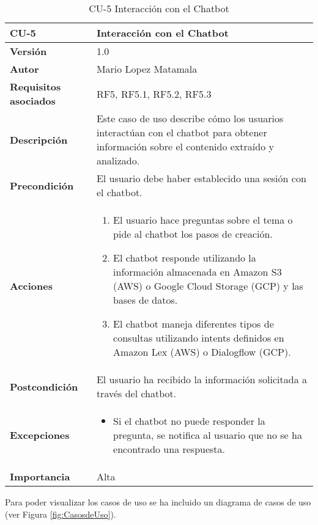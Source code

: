 \begin{table}[p]
\centering
\begin{tabularx}{\linewidth}{ p{} p{} }
\toprule
\textbf{CU-5} & \textbf{Interacción con el Chatbot} \\
\toprule
\textbf{Versión} & 1.0 \\
\textbf{Autor} & Mario Lopez Matamala \\
\textbf{Requisitos asociados} & RF5, RF5.1, RF5.2, RF5.3 \\
\textbf{Descripción} & Este caso de uso describe cómo los usuarios interactúan con el chatbot para obtener información sobre el contenido extraído y analizado. \\
\textbf{Precondición} & El usuario debe haber establecido una sesión con el chatbot. \\
\textbf{Acciones} &
\begin{enumerate}
\def\labelenumi{\arabic{enumi}.}
\tightlist
\item El usuario hace preguntas sobre el tema o pide al chatbot los pasos de creación.
\item El chatbot responde utilizando la información almacenada en Amazon S3 (AWS) o Google Cloud Storage (GCP) y las bases de datos.
\item El chatbot maneja diferentes tipos de consultas utilizando intents definidos en Amazon Lex (AWS) o Dialogflow (GCP).
\end{enumerate} \\
\textbf{Postcondición} & El usuario ha recibido la información solicitada a través del chatbot. \\
\textbf{Excepciones} &
\begin{itemize}
\item Si el chatbot no puede responder la pregunta, se notifica al usuario que no se ha encontrado una respuesta.
\end{itemize} \\
\textbf{Importancia} & Alta \\
\bottomrule
\end{tabularx}
\caption{CU-5 Interacción con el Chatbot}
\label{tab:cu5}
\end{table}

Para poder visualizar los casos de uso se ha incluido un diagrama de casos de uso (ver Figura \ref{fig:CasosdeUso}).


